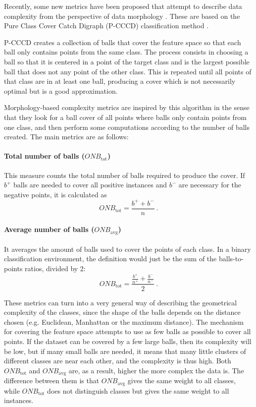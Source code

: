 \documentclass[
	fontsize=11pt, %
	twoside=false, %
	open=any, %
	secnumdepth=1, %
]{kaobook}
\newcommand{\change}[1]{{\color{blue}#1}}
\renewcommand{\change}[1]{#1}
\begin{document}
Recently, some new metrics have been proposed that attempt to describe data complexity from the perspective of data morphology \cite{pascual2020revisiting}. These are based on the Pure Class Cover Catch Digraph (P-CCCD) classification method \cite{pcccd}.

P-CCCD creates a collection of balls that cover the feature space so that each ball only contains points from the same class. The process consists in choosing a ball so that it is centered in a point of the target class and is the largest possible ball that does not any point of the other class. This is repeated until all points of that class are in at least one ball, producing a cover which is not necessarily optimal but is a good approximation.

Morphology-based complexity metrics are inspired by this algorithm in the sense that they look for a ball cover of all points where balls only contain points from one class, and then perform some computations according to the number of balls created. The main metrics are as follows:

\paragraph*{Total number of balls ($\textit{ONB}_{\text{tot}}$)} This measure counts the total number of balls required to produce the cover. If $b^+$ balls are needed to cover all positive instances and $b^-$ are necessary \change{for} the negative points, it is calculated as \begin{equation}\textit{ONB}_{\text{tot}}=\frac{b^++b^-}{n}~.\end{equation}
\paragraph*{Average number of balls ($\textit{ONB}_{\text{avg}}$)}  It averages the amount of balls used to cover the points of each class. In a binary classification environment, the definition would just be the sum of the balls-to-points ratios, divided by 2: \begin{equation}\textit{ONB}_{\text{tot}}=\frac{\frac{b^+}{n^+}+\frac{b^-}{n^-}}{2}~.\end{equation}


These metrics can turn into a very general way of describing the geometrical complexity of the classes, since the shape of the balls depends on the distance chosen (e.g. Euclidean, Manhattan or the maximum distance). The mechanism for covering the feature space attempts to use as few balls as possible to cover all points. If the dataset can be covered by a few large balls, then its complexity will be low, but if many small balls are needed, it means that many little clusters of different classes are near each other, and the complexity is thus high. Both $\textit{ONB}_{\text{tot}}$ and $\textit{ONB}_{\text{avg}}$ are, as a result, higher the more complex the data is. The difference between them is that $\textit{ONB}_{\text{avg}}$ gives the same weight to all classes, while $\textit{ONB}_{\text{tot}}$ does not distinguish classes but gives the same weight to all instances.
\end{document}

